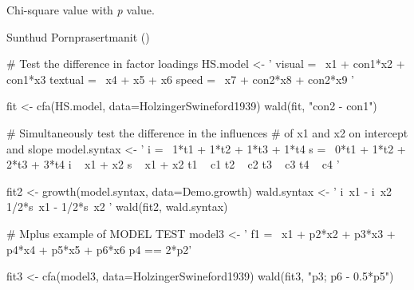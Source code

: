 \documentclass[a4paper]{book}
\begin{document}
%
\begin{Value}
Chi-square value with \emph{p} value.
\end{Value}
%
\begin{Author}\relax
Sunthud Pornprasertmanit ()
\end{Author}
%
\begin{Examples}
\begin{ExampleCode}
# Test the difference in factor loadings
HS.model <- ' visual  =~ x1 + con1*x2 + con1*x3
              textual =~ x4 + x5 + x6
              speed   =~ x7 + con2*x8 + con2*x9 '

fit <- cfa(HS.model, data=HolzingerSwineford1939)
wald(fit, "con2 - con1")

# Simultaneously test the difference in the influences 
# of x1 and x2 on intercept and slope
model.syntax <- '
    i =~ 1*t1 + 1*t2 + 1*t3 + 1*t4
    s =~ 0*t1 + 1*t2 + 2*t3 + 3*t4
    i ~ x1 + x2
    s ~ x1 + x2
    t1 ~ c1
    t2 ~ c2
    t3 ~ c3
    t4 ~ c4
'

fit2 <- growth(model.syntax, data=Demo.growth)
wald.syntax <- '
	i~x1 - i~x2
	1/2*s~x1 - 1/2*s~x2
'
wald(fit2, wald.syntax)

# Mplus example of MODEL TEST
model3 <- ' f1  =~ x1 + p2*x2 + p3*x3 + p4*x4 + p5*x5 + p6*x6
			p4 == 2*p2'

fit3 <- cfa(model3, data=HolzingerSwineford1939)
wald(fit3, "p3; p6 - 0.5*p5")
\end{ExampleCode}
\end{Examples}
\printindex{}
\end{document}
